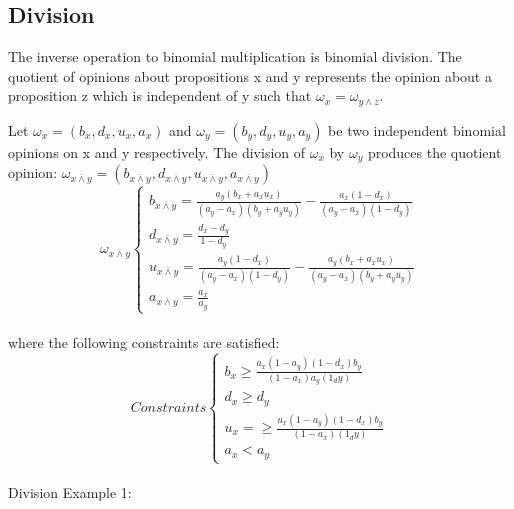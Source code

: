 \documentclass[UTF8]{article}
\newcommand{\opinion}[5]{$\omega_{#1} = (#2, #3, #4, #5)$}
\begin{document}
\subsection{Division}
The inverse operation to binomial multiplication is binomial division. The quotient
of opinions about propositions x and y represents the opinion about a proposition z
which is independent of y such that $\omega_x = \omega_{y \land z}$.

Let \opinion{x}{b_x}{d_x}{u_x}{a_x} and \opinion{y}{b_y}{d_y}{u_y}{a_y} be two independent binomial opinions on x and y respectively.
The division of $\omega_x$ by $\omega_y$ produces the quotient opinion: \opinion{x \overline{\land} y}{b_{x \overline{\land} y}}{d_{x \overline{\land} y}}{u_{x \overline{\land} y}}{a_{x \overline{\land} y}}
$$
\omega_{x \overline{\land} y}
\begin{cases}
    b_{x \overline{\land} y} = \frac{a_y(b_x + a_xu_x)}{(a_y - a_x)(b_y + a_yu_y)} - \frac{a_x (1 - d_x)}{(a_y - a_x)(1 - d_y)}\\
    d_{x \overline{\land} y} = \frac{d_x - d_y}{1 - d_y}\\
    u_{x \overline{\land} y} = \frac{a_y (1 - d_x)}{(a_y - a_x)(1 - d_y)} - \frac{a_y(b_x + a_xu_x)}{(a_y - a_x)(b_y + a_yu_y)}\\
    a_{x \overline{\land} y} = \frac{a_x}{a_y}
\end{cases}
$$\\
where the following constraints are satisfied:
$$
Constraints
\begin{cases}
    b_x \geq \frac{a_x(1 - a_y) (1 - d_x) b_y}{(1 - a_x)a_y (1_dy)}\\
    d_x \geq d_y\\
    u_x = \geq \frac{u_x(1 - a_y) (1 - d_x) b_y}{(1 - a_x) (1_dy)}\\
    a_x < a_y
\end{cases}
$$\\
Division Example 1:\\
\end{document}
